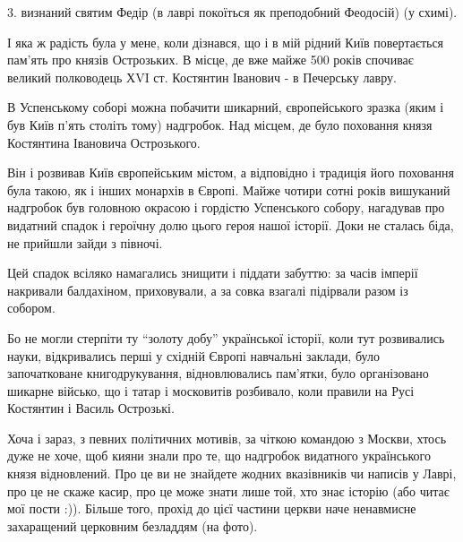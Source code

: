 3. визнаний святим Федір (в лаврі покоїться як преподобний Феодосій) (у схимі).

І яка ж радість була у мене, коли дізнався, що і в мій рідний Київ повертається
пам’ять про князів Острозьких. В місце, де вже майже 500 років спочиває великий
полководець ХVI ст. Костянтин Іванович - в Печерську лавру.


В Успенському соборі можна побачити шикарний, європейського зразка (яким і був
Київ п’ять століть тому) надгробок. Над місцем, де було поховання князя
Костянтина Івановича Острозького. 

Він і розвивав Київ європейським містом, а відповідно і традиція його поховання
була такою, як і інших монархів в Європі. Майже чотири сотні років вишуканий
надгробок був головною окрасою і гордістю Успенського собору, нагадував про
видатний спадок і героїчну долю цього героя нашої історії. Доки не сталась
біда, не прийшли зайди з півночі.


Цей спадок всіляко намагались знищити і піддати забуттю: за часів імперії
накривали балдахіном, приховували, а за совка взагалі підірвали разом із
собором. 


Бо не могли стерпіти ту \enquote{золоту добу} української історії, коли тут
розвивались науки, відкривались перші у східній Європі навчальні заклади, було
започатковане книгодрукування, відновлювались пам’ятки, було організовано
шикарне військо, що і татар і московитів розбивало, коли правили на Русі
Костянтин і Василь Острозькі.  

Хоча і зараз, з певних політичних мотивів, за чіткою командою з Москви, хтось
дуже не хоче, щоб кияни знали про те, що надгробок видатного українського князя
відновлений. Про це ви не знайдете жодних вказівників чи написів у Лаврі, про
це не скаже касир, про це може знати лише той, хто знає історію (або читає мої
пости :)). Більше того, прохід до цієї частини церкви наче ненавмисне
захаращений церковним безладдям (на фото). 

\raggedcolumns
\begin{multicols}{2} %
\setlength{\parindent}{0pt}





\end{multicols} %

